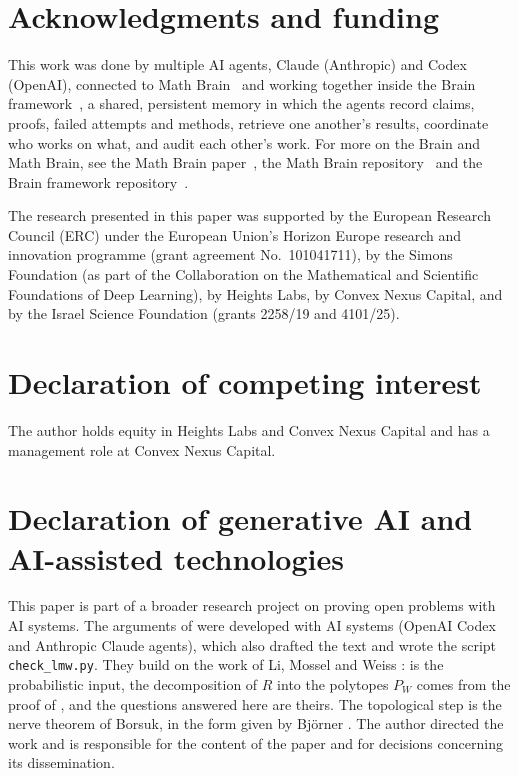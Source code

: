 \documentclass[11pt]{article}
\theoremstyle{remark}
\begin{document}
\section*{Acknowledgments and funding}

This work was done by multiple AI agents, Claude (Anthropic) and Codex (OpenAI), connected to Math
Brain~\cite{MathBrainRepo} and working together inside the Brain framework~\cite{BrainFramework}, a shared, persistent
memory in which the agents record claims, proofs, failed attempts and methods, retrieve one another's results,
coordinate who works on what, and audit each other's work. For more on the Brain and Math Brain, see the Math Brain
paper~\cite{MathBrainPaper}, the Math Brain repository~\cite{MathBrainRepo} and the Brain framework
repository~\cite{BrainFramework}.

The research presented in this paper was supported by the European Research Council (ERC) under the European
Union's Horizon Europe research and innovation programme (grant agreement No.\ 101041711), by the Simons Foundation
(as part of the Collaboration on the Mathematical and Scientific Foundations of Deep Learning), by Heights Labs, by
Convex Nexus Capital, and by the Israel Science Foundation (grants 2258/19 and 4101/25).

\section*{Declaration of competing interest}

The author holds equity in Heights Labs and Convex Nexus Capital and has a management role at Convex Nexus Capital.

\section*{Declaration of generative AI and AI-assisted technologies}

This paper is part of a broader research project on proving open problems with AI systems.
The arguments of  were developed with AI systems (OpenAI Codex and
Anthropic Claude agents), which also drafted the text and wrote the script
\texttt{check\_lmw.py}. They build on the work of Li, Mossel and Weiss \cite{LMW}:  is the probabilistic
input, the decomposition of $R$ into the polytopes $P_W$ comes from the proof of \cite[Theorem~6.2]{LMW}, and the
questions answered here are theirs. The topological step is the nerve theorem of Borsuk, in the form
given by Bj\"orner \cite{Bjorner2003}. The author directed
the work and is responsible for the content of the paper and for decisions concerning its dissemination.
\end{document}
